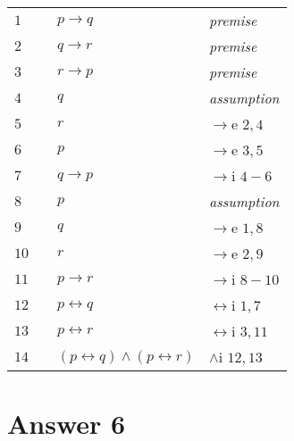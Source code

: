 \documentclass[12pt]{article}
\begin{document}
\begin{table}[H]
	\centering
	\begin{tabular}{*4{l}}
		$1$ & & $p \rightarrow q$ & \textit{premise} \\ 
		
		$2$ & & $q \rightarrow r$ & \textit{premise} \\ 
		
		$3$ & & $r \rightarrow p$ & \textit{premise} \\  \hline
		
		$4$ & & $q$ &\textit{assumption}\\ 
		
		$5$ & & $r$ &$\rightarrow$e $2,4$\\
		
		$6$ & & $p$ &$\rightarrow$e $3,5$\\ \hline
		
		$7$ & & $q \rightarrow p$ &$\rightarrow$i $4-6$\\ \hline
		
		$8$ & & $p$ &\textit{assumption}\\ 
		
		$9$ & & $q$ &$\rightarrow$e $1,8$\\
		
		$10$ & & $r$ &$\rightarrow$e $2,9$\\ \hline
		
		$11$ & & $p \rightarrow r$ &$\rightarrow$i $8-10$\\
		
		$12$ & & $p \leftrightarrow q$ &$\leftrightarrow$i $1,7$\\
		
		$13$ & & $p \leftrightarrow r$ &$\leftrightarrow$i $3,11$\\
		
		$14$ & & $(p \leftrightarrow q) \wedge (p \leftrightarrow r)$ &$\wedge$i $12,13$\\
		
	\end{tabular}
\end{table}

\section*{Answer 6}
\end{document}
